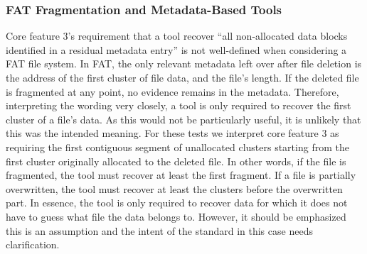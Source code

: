 \documentclass{ws-rv9x6}
\newenvironment{paraphrase}{\color{blue}}{\color{black}} %
\begin{document}
\subsubsection{FAT Fragmentation and Metadata-Based Tools}
\begin{paraphrase}
Core feature 3's requirement that a tool recover ``all non-allocated data blocks identified in a residual metadata entry''\cite{meta:dfr:standards} is not well-defined when considering a FAT file system. 
In FAT, the only relevant metadata left over after file deletion is the address of the first cluster of file data, and the file's length. 
If the deleted file is fragmented at any point, no evidence remains in the metadata. 
Therefore, interpreting the wording very closely, a tool is only required to recover the first cluster of a file's data. 
As this would not be particularly useful, it is unlikely that this was the intended meaning. 
For these tests we interpret core feature 3 as requiring the first contiguous segment of unallocated clusters starting from the first cluster originally allocated to the deleted file. 
In other words, if the file is fragmented, the tool must recover at least the first fragment. 
If a file is partially overwritten, the tool must recover at least the clusters before the overwritten part.
In essence, the tool is only required to recover data for which it does not have to guess what file the data belongs to.
However, it should be emphasized this is an assumption and the intent of the standard in this case needs clarification.
\end{paraphrase}
\end{document}
